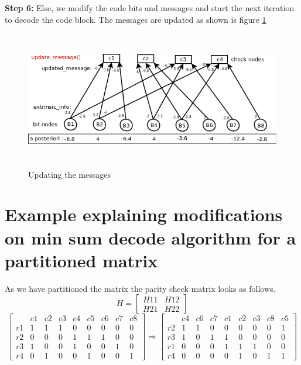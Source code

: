 \textbf{Step 6:}
Else, we modify the code bits and messages and start the next iteration to decode the code block. The messages are updated as shown is figure \ref{minSum7}
\begin{figure}[h!]
\centering
\includegraphics[height=6cm,width=12cm]{minSum7}
\caption[Updating the messages]{Updating the messages}
\label{minSum7}
\end{figure}

\section{ Example explaining modifications on min sum decode algorithm for a partitioned matrix }

As we have partitioned the matrix the parity check matrix looks as follows.
\[
H = \left[ \begin{array}{c|c}  
H11  & H12     \\ \hline
H21  & H22     \end{array} \right] 
\] 
\[
\left[ \begin{array} {c|cccccccc} 
  &    c1 &   c2 &   c3 &  c4  &  c5  &  c6  &  c7  &  c8 \\ \hline
r1 &    1  &   1  &   1  &   0  &   0  &   0  &   0  &   0 \\
r2 &    0  &   0  &   0  &   1  &   1  &   1  &   0  &   0 \\ 
r3 &    1  &   0  &   0  &   1  &   0  &   0  &   1  &   0 \\
r4 &    0  &   1  &   0  &   0  &   1  &   0  &   0  &   1 \end{array} \right] 
     \Rightarrow
\left[ \begin{array} {c|cccc|cccc} 
  &    c4 &   c6 &   c7 &  c1  &  c2  &  c3  &  c8  &  c5 \\ \hline  
r2 &     1  &   1  &   0  &   0  &   0  &   0  &   0  &   1 \\
r3 &     1  &   0  &   1  &   1  &   0  &   0  &   0  &   0 \\ \hline
r1 &     0  &   0  &   0  &   1  &   1  &   1  &   0  &   0 \\
r4 &     0  &   0  &   0  &   0  &   1  &   0  &   1  &   1 \end{array} \right] 
\]

